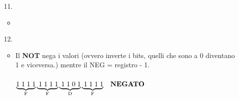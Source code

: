 \begin{enumerate}
		\item[11.]  \\
		\begin{itemize}
			\item {} \\
		\end{itemize}
	\item[12.]  \\
	\begin{itemize}
		\item \textsf{{\small Il \textbf{NOT} nega i valori (ovvero inverte i bits, quelli che sono a 0 diventano 1 e viceversa.) mentre il NEG = registro - 1.}} \\
		 \\
		$ \underbrace{1\hspace{.1cm}1\hspace{.1cm}1\hspace{.1cm}1} _{\text{F}} \underbrace{\hspace{.1cm}1\hspace{.1cm}1\hspace{.1cm}1\hspace{.1cm}1} _{\text{F}} \underbrace{\hspace{.1cm}1\hspace{.1cm}1\hspace{.1cm}0\hspace{.1cm}1} _{\text{D}} \underbrace{\hspace{.1cm}1\hspace{.1cm}1\hspace{.1cm}1\hspace{.1cm}1} _{\text{F}} \hspace{.3cm}\textbf{NEGATO} $ \\

\end{itemize}
\end{enumerate}
